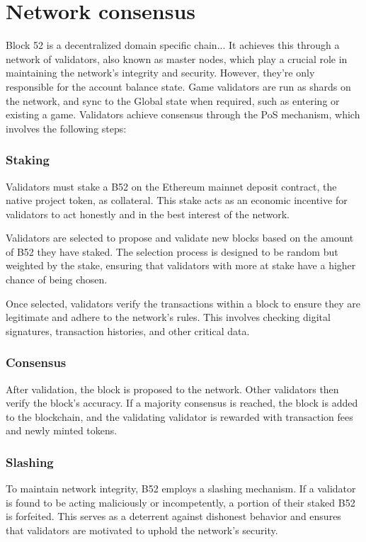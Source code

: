 \documentclass{article}
\begin{document}
\section{Network consensus}
Block 52 is a decentralized domain specific chain... It achieves this through a network of validators, also known as master nodes, which play a crucial role in maintaining the network's integrity and security. However, they're only responsible for the account balance state.  Game validators are run as shards on the network, and sync to the Global state when required, such as entering or existing a game.  Validators achieve consensus through the PoS mechanism, which involves the following steps:

\subsubsection*{Staking}
Validators must stake a B52 on the Ethereum mainnet deposit contract, the native project token, as collateral. This stake acts as an economic incentive for validators to act honestly and in the best interest of the network.

Validators are selected to propose and validate new blocks based on the amount of B52 they have staked. The selection process is designed to be random but weighted by the stake, ensuring that validators with more at stake have a higher chance of being chosen.

Once selected, validators verify the transactions within a block to ensure they are legitimate and adhere to the network's rules. This involves checking digital signatures, transaction histories, and other critical data.

\subsubsection*{Consensus}
After validation, the block is proposed to the network. Other validators then verify the block's accuracy. If a majority consensus is reached, the block is added to the blockchain, and the validating validator is rewarded with transaction fees and newly minted tokens.

\subsubsection*{Slashing}
To maintain network integrity, B52 employs a slashing mechanism. If a validator is found to be acting maliciously or incompetently, a portion of their staked B52 is forfeited. This serves as a deterrent against dishonest behavior and ensures that validators are motivated to uphold the network's security.
\end{document}
